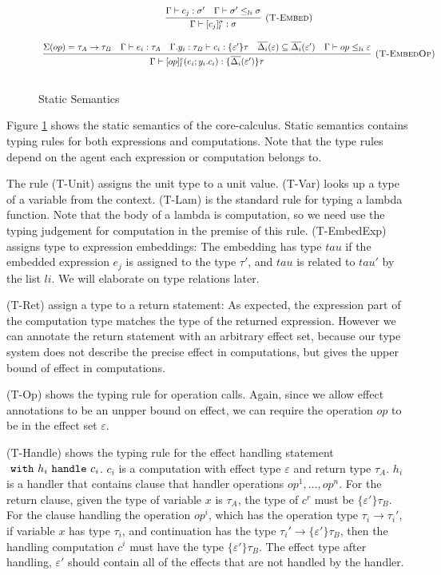 \begin{figure}[t]
{\[\begin{array}{c}
\infer[\textsc{(T-Embed)}]
  {\Gamma\vdash [c_j]^\sigma_l : \sigma }
  {\Gamma \vdash c_j : \sigma' & \Gamma \vdash \sigma' \leq_{li} \sigma  } \\[3ex]
  
\infer[\textsc{(T-EmbedOp)}]
  {\Gamma\vdash [op]^\varepsilon_l(e_i; y_i.c_i) : \{\overline{\Delta_i}(\varepsilon')\}\tau }
  {\Sigma(op) = \tau_A \rightarrow \tau_B & \Gamma \vdash e_i : \tau_A & \Gamma. y_i:\tau_B\vdash c_i: \{\varepsilon'\}\tau & \overline{\Delta_i}(\varepsilon) \subseteq \overline{\Delta_i}(\varepsilon') & \Gamma \vdash op \leq_{li} \varepsilon} \\[3ex]
  
\end{array} \\[3ex]
\]
}


\caption{Static Semantics}
\label{wrap-static}
\end{figure}

Figure \ref{wrap-static} shows the static semantics of the core-calculus. Static semantics contains typing rules for both expressions and computations. Note that the type rules depend on the agent each expression or computation belongs to. 

The rule (T-Unit) assigns the unit type to a unit value. (T-Var) looks up a type of a variable from the context. (T-Lam) is the standard rule for typing a lambda function. Note that the body of a lambda is computation, so we need use the typing judgement for computation in the premise of this rule. (T-EmbedExp) assigns type to expression embeddings: The embedding has type $tau$ if the embedded expression $e_j$ is assigned to the type $\tau'$, and $tau$ is related to $tau'$ by the list $li$. We will elaborate on type relations later. 

(T-Ret) assign a type to a return statement: As expected, the expression part of the computation type matches the type of the returned expression. However we can annotate the return statement with an arbitrary effect set, because our type system does not describe the precise effect in computations, but gives the upper bound of effect in computations.  

(T-Op) shows the typing rule for operation calls. Again, since we allow effect annotations to be an unpper bound on effect, we can require the operation $op$ to be in the effect set $\varepsilon$.

(T-Handle) shows the typing rule for the effect handling statement $\ \texttt{with}\  h_i \ \texttt{handle}\  c_i$. $c_i$ is a computation with effect type $\varepsilon$ and return type $\tau_A$. $h_i$ is a handler that contains clause that handler operations $op^1 , \dots ,op^n$. For the return clause, given the type of variable $x$ is $\tau_A$, the type of $c^r$ must be $\{\varepsilon'\}\tau_B$. For the clause handling the operation $op^i$, which has the operation type $\tau_i \rightarrow \tau_i'$,  if variable $x$ has type $\tau_i$, and continuation has the type $\tau_i' \rightarrow \{\varepsilon'\}\tau_B$, then the handling computation $c^i$ must have the type $\{\varepsilon'\}\tau_B$. The effect type after handling, $\varepsilon'$ should contain all of the effects that are not handled by the handler.


